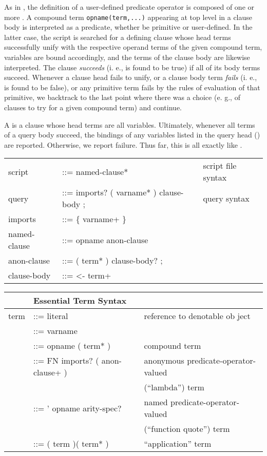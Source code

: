 As in \prolog, the definition of a user-defined predicate operator is composed
of one or more . A compound term \verb|opname(term,...)| appearing
at top level in a clause body is interpreted as a predicate, whether
 be primitive or user-defined. In the latter case, the script is
searched for a defining clause whose head terms successfully unify with the
respective operand terms of the given compound term, variables are bound
accordingly, and the terms of the clause body are likewise interpreted. The
clause \emph{succeeds} (i. e., is found to be true) if all of its body terms
succeed. Whenever a clause head fails to unify, or a clause body term
\emph{fails} (i. e., is found to be false), or any primitive term fails by the
rules of evaluation of that primitive, we backtrack to the last point where
there was a choice (e. g., of clauses to try for a given compound term) and
continue.

A  is a clause whose head terms are all variables. Ultimately,
whenever all terms of a query body succeed, the bindings of any variables listed
in the query head () are reported. Otherwise, we report failure.
Thus far, this is all exactly like \prolog.

\label{crewsyntax} 

\begin{tabular}{l l l}
script & ::= named-clause* & script file syntax \\
query & ::= imports? ( varname* ) clause-body ; & query syntax \\
imports & ::= \{ varname+ \} &\\
named-clause & ::= opname anon-clause &\\
anon-clause & ::= ( term* ) clause-body? ; &\\
clause-body & ::= <- term+ &\\
\end{tabular}

\noindent
\begin{tabular}{l l l}
\hline
&Essential Term Syntax&\\
\hline
term & ::= literal & reference to denotable ob ject \\
& ::= varname &\\
& ::= opname ( term* ) & compound term \\
& ::= FN imports? ( anon-clause+ ) & anonymous predicate-operator-valued 
\\&&(``lambda'') term \\
& ::= ' opname arity-spec? & named predicate-operator-valued
\\&&(``function quote'') term \\
& ::= ( term )( term* ) & ``application'' term \\ 
\end{tabular}

